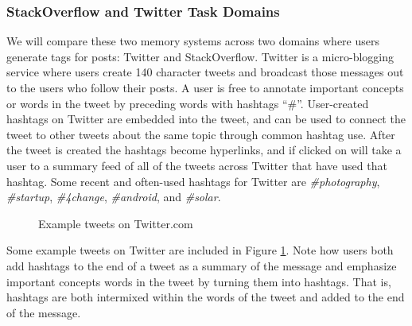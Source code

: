 \documentclass[man,floatsintext]{apa6}
\begin{document}
\subsubsection{StackOverflow and Twitter Task Domains}

We will compare these two memory systems across two domains where users generate tags for posts: Twitter and StackOverflow.
Twitter is a micro-blogging service where users create 140 character tweets and broadcast those messages out to the users who follow their posts.
A user is free to annotate important concepts or words in the tweet by preceding words with hashtags ``\#''.
User-created hashtags on Twitter are embedded into the tweet, and can be used to connect the tweet to other tweets about the same topic through common hashtag use.
After the tweet is created the hashtags become hyperlinks, and if clicked on will take a user to a summary feed of all of the tweets across Twitter that have used that hashtag.
Some recent and often-used hashtags for Twitter are \emph{\#photography}, \emph{\#startup}, \emph{\#4change}, \emph{\#android}, and \emph{\#solar}.

\begin{figure}[!htbp]
  {%
    \setlength{\fboxsep}{0pt}%
    \setlength{\fboxrule}{1pt}%
    \hfill
    \hfill
    \hfill
    \vfill
    \hfill
    \hfill
    \hfill
    \caption{Example tweets on Twitter.com}
    \label{figTweetExample}
  }%
\end{figure}

Some example tweets on Twitter are included in Figure \ref{figTweetExample}.
Note how users both add hashtags to the end of a tweet as a summary of the message and emphasize important concepts words in the tweet by turning them into hashtags.
That is, hashtags are both intermixed within the words of the tweet and added to the end of the message.
\end{document}
